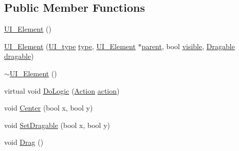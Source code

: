 \subsection*{Public Member Functions}
\begin{DoxyCompactItemize}
\item 
\mbox{\hyperlink{class_u_i___element_a4b337671cff586ef9c8bcbcd06a08356}{U\+I\+\_\+\+Element}} ()
\item 
\mbox{\hyperlink{class_u_i___element_ad7184033dd8aff731f4a4f555bded9c8}{U\+I\+\_\+\+Element}} (\mbox{\hyperlink{class_u_i___element_a7ed595c46c75d53d30fa3813b036cf1e}{U\+I\+\_\+type}} \mbox{\hyperlink{class_u_i___element_ad40069673afbc9b0fbd596ef164e8e92}{type}}, \mbox{\hyperlink{class_u_i___element}{U\+I\+\_\+\+Element}} $\ast$\mbox{\hyperlink{class_u_i___element_a3e9ec27fe0cc3d30c351a9405733439f}{parent}}, bool \mbox{\hyperlink{class_u_i___element_a78aac2800a8d8db3ab76caddf3ece0c4}{visible}}, \mbox{\hyperlink{struct_dragable}{Dragable}} \mbox{\hyperlink{class_u_i___element_ac2b4266648ab33c1a486bfa8fd79d474}{dragable}})
\item 
\mbox{\hyperlink{class_u_i___element_aad1976da74baf5d57087f27ad43d1401}{$\sim$\+U\+I\+\_\+\+Element}} ()
\item 
virtual void \mbox{\hyperlink{class_u_i___element_aef56a211bea0e79047fb2d382789ff90}{Do\+Logic}} (\mbox{\hyperlink{class_u_i___element_ae179047d98a379f4e0dcdf0871c7b8d6}{Action}} \mbox{\hyperlink{class_u_i___element_a1d416dd216b21b0cfd8e234edad2b472}{action}})
\item 
void \mbox{\hyperlink{class_u_i___element_af6d7b22a1dcb4e2d07e6b28585f5ae48}{Center}} (bool x, bool y)
\item 
void \mbox{\hyperlink{class_u_i___element_a6b950c18db35c9328a3463860dcbcd04}{Set\+Dragable}} (bool x, bool y)
\item 
void \mbox{\hyperlink{class_u_i___element_a331ca65f09fc4651681cf0126d1f4bbc}{Drag}} ()
\end{DoxyCompactItemize}
